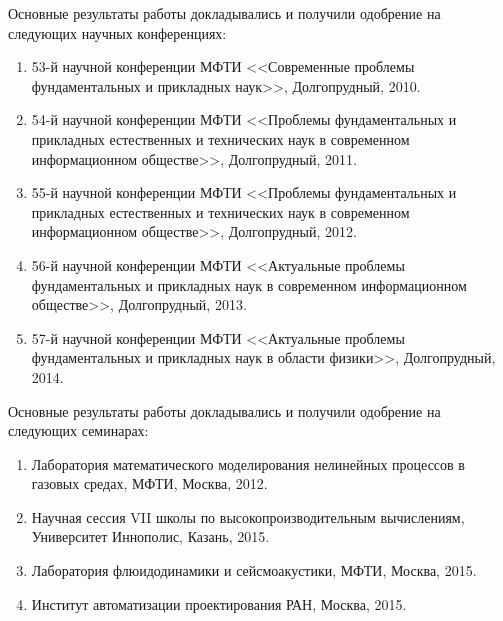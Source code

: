 Основные результаты работы докладывались и получили одобрение на следующих научных конференциях:
\begin{enumerate}
\item 53-й научной конференции МФТИ <<Современные проблемы фундаментальных и прикладных наук>>, Долгопрудный, 2010.
\item 54-й научной конференции МФТИ <<Проблемы фундаментальных и прикладных естественных и технических наук в современном информационном обществе>>, Долгопрудный, 2011.
\item 55-й научной конференции МФТИ <<Проблемы фундаментальных и прикладных естественных и технических наук в современном информационном обществе>>, Долгопрудный, 2012.
\item 56-й научной конференции МФТИ <<Актуальные проблемы фундаментальных и прикладных наук в современном информационном обществе>>, Долгопрудный, 2013.
\item 57-й научной конференции МФТИ <<Актуальные проблемы фундаментальных и прикладных наук в области физики>>, Долгопрудный, 2014.
\end{enumerate}

Основные результаты работы докладывались и получили одобрение на следующих семинарах:
\begin{enumerate}
\item Лаборатория математического моделирования нелинейных процессов в газовых средах, МФТИ, Москва, 2012.
\item Научная сессия VII школы по высокопроизводительным вычислениям, Университет Иннополис, Казань, 2015.
\item Лаборатория флюидодинамики и сейсмоакустики, МФТИ, Москва, 2015.
\item Институт автоматизации проектирования РАН, Москва, 2015.
\end{enumerate}
